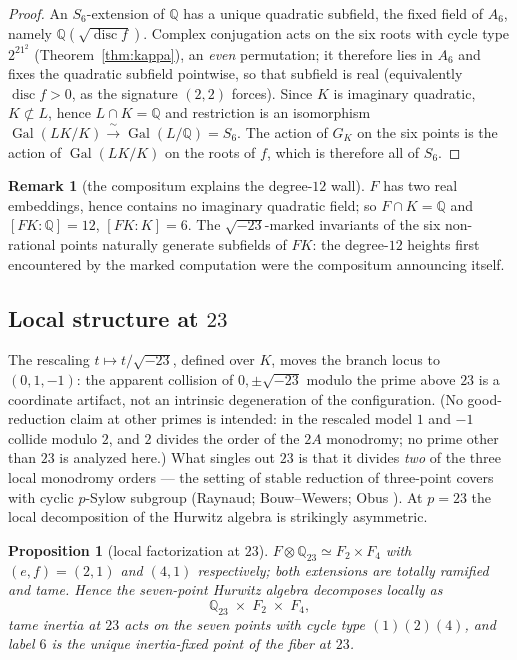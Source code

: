 \documentclass[11pt]{amsart}
\newcommand{\QQ}{\mathbb{Q}}
\newcommand{\GK}{G_{K}}
\newcommand{\sqm}{\sqrt{-23}}
\theoremstyle{plain}
\newtheorem{proposition}[theorem]{Proposition}
\theoremstyle{definition}
\newtheorem{remark}[theorem]{Remark}
\begin{document}
\begin{proof}
An $S_6$-extension of $\QQ$ has a unique quadratic subfield, the
fixed field of $A_6$, namely
$\QQ(\sqrt{\operatorname{disc}f})$. Complex conjugation acts on the
six roots with cycle type $2^21^2$ (Theorem~\ref{thm:kappa}), an
\emph{even} permutation; it therefore lies in $A_6$ and fixes the
quadratic subfield pointwise, so that subfield is real
(equivalently $\operatorname{disc}f>0$, as the signature $(2,2)$
forces). Since $K$ is imaginary quadratic, $K\not\subset L$, hence
$L\cap K=\QQ$ and restriction is an isomorphism
$\operatorname{Gal}(LK/K)\xrightarrow{\;\sim\;}
\operatorname{Gal}(L/\QQ)=S_6$. The action of $\GK$ on the six
points is the action of $\operatorname{Gal}(LK/K)$ on the roots of
$f$, which is therefore all of $S_6$.
\end{proof}

\begin{remark}[the compositum explains the degree-$12$ wall]
$F$ has two real embeddings, hence contains no imaginary quadratic
field; so $F\cap K=\QQ$ and $[FK:\QQ]=12$, $[FK:K]=6$. The
$\sqm$-marked invariants of the six non-rational points naturally
generate subfields of $FK$: the degree-$12$ heights first encountered
by the marked computation were the compositum announcing itself.
\end{remark}

\subsection*{Local structure at $23$}
The rescaling $t\mapsto t/\sqm$, defined over $K$, moves the branch
locus to $(0,1,-1)$: the apparent collision of $0,\pm\sqm$ modulo
the prime above $23$ is a coordinate artifact, not an intrinsic
degeneration of the configuration. (No good-reduction claim at
other primes is intended: in the rescaled model $1$ and $-1$
collide modulo $2$, and $2$ divides the order of the $2A$
monodromy; no prime other than $23$ is analyzed here.) What singles
out $23$ is that it divides \emph{two} of the three local monodromy
orders --- the setting of stable reduction of three-point covers
with cyclic $p$-Sylow subgroup (Raynaud; Bouw--Wewers; Obus
\cite{ObusI,ObusII}). At $p=23$ the local decomposition of the
Hurwitz algebra is strikingly asymmetric.

\begin{proposition}[local factorization at $23$]\label{prop:local23}
$F\otimes\QQ_{23}\simeq F_2\times F_4$ with
$(e,f)=(2,1)$ and $(4,1)$ respectively; both extensions are totally
ramified and tame. Hence the seven-point Hurwitz algebra decomposes
locally as
\[
  \QQ_{23}\;\times\;F_2\;\times\;F_4 ,
\]
tame inertia at $23$ acts on the seven points with cycle type
$(1)(2)(4)$, and \emph{label $6$ is the unique inertia-fixed point of
the fiber at $23$}.
\end{proposition}
\end{document}
